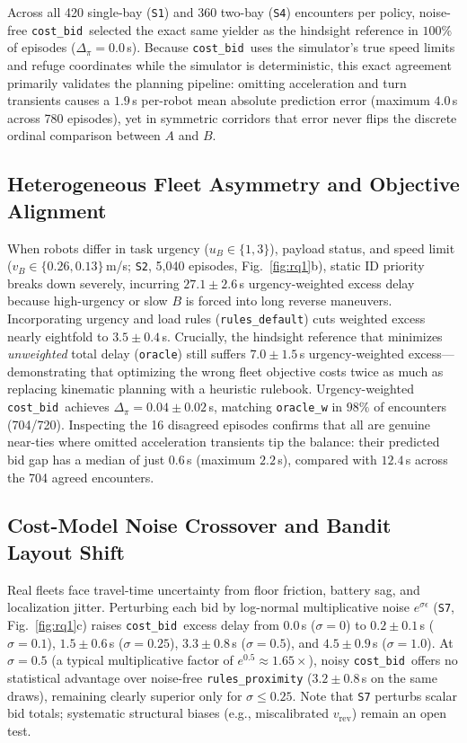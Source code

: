 \documentclass[letterpaper,journal]{IEEEtran}
\newcommand{\cb}{\texttt{cost\_bid}}
\begin{document}
Across all 420 single-bay (\texttt{S1}) and 360 two-bay (\texttt{S4}) encounters per policy, noise-free \cb\ selected the exact same yielder as the hindsight reference in $100\%$ of episodes ($\Delta_\pi = 0.0$\,s). Because \cb\ uses the simulator's true speed limits and refuge coordinates while the simulator is deterministic, this exact agreement primarily validates the planning pipeline: omitting acceleration and turn transients causes a $1.9$\,s per-robot mean absolute prediction error (maximum $4.0$\,s across 780 episodes), yet in symmetric corridors that error never flips the discrete ordinal comparison between $A$ and $B$.

\subsection{Heterogeneous Fleet Asymmetry and Objective Alignment}
When robots differ in task urgency ($u_B\in\{1,3\}$), payload status, and speed limit ($v_B\in\{0.26,0.13\}$\,m/s; \texttt{S2}, 5,040 episodes, Fig.~\ref{fig:rq1}b), static ID priority breaks down severely, incurring $27.1\pm 2.6$\,s urgency-weighted excess delay because high-urgency or slow $B$ is forced into long reverse maneuvers. Incorporating urgency and load rules (\texttt{rules\_default}) cuts weighted excess nearly eightfold to $3.5\pm 0.4$\,s. Crucially, the hindsight reference that minimizes \emph{unweighted} total delay (\texttt{oracle}) still suffers $7.0\pm 1.5$\,s urgency-weighted excess---demonstrating that optimizing the wrong fleet objective costs twice as much as replacing kinematic planning with a heuristic rulebook. Urgency-weighted \cb\ achieves $\Delta_\pi = 0.04\pm 0.02$\,s, matching \texttt{oracle\_w} in $98\%$ of encounters (704/720). Inspecting the 16 disagreed episodes confirms that all are genuine near-ties where omitted acceleration transients tip the balance: their predicted bid gap has a median of just $0.6$\,s (maximum $2.2$\,s), compared with $12.4$\,s across the 704 agreed encounters.

\subsection{Cost-Model Noise Crossover and Bandit Layout Shift}
Real fleets face travel-time uncertainty from floor friction, battery sag, and localization jitter. Perturbing each bid by log-normal multiplicative noise $e^{\sigma\epsilon}$ (\texttt{S7}, Fig.~\ref{fig:rq1}c) raises \cb\ excess delay from $0.0$\,s ($\sigma=0$) to $0.2\pm 0.1$\,s ($\sigma=0.1$), $1.5\pm 0.6$\,s ($\sigma=0.25$), $3.3\pm 0.8$\,s ($\sigma=0.5$), and $4.5\pm 0.9$\,s ($\sigma=1.0$). At $\sigma=0.5$ (a typical multiplicative factor of $e^{0.5}\approx 1.65\times$), noisy \cb\ offers no statistical advantage over noise-free \texttt{rules\_proximity} ($3.2\pm 0.8$\,s on the same draws), remaining clearly superior only for $\sigma\le 0.25$. Note that \texttt{S7} perturbs scalar bid totals; systematic structural biases (e.g., miscalibrated $v_{\mathrm{rev}}$) remain an open test.
\end{document}
